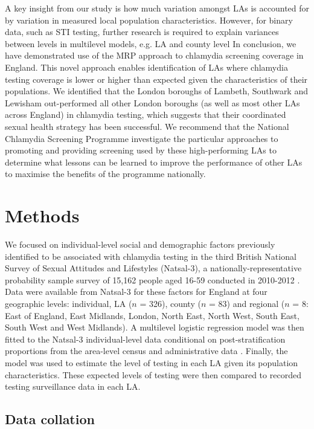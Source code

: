 \documentclass[fleqn,10pt]{wlscirep}
\begin{document}
A key insight from our study is how much variation amongst LAs is accounted for by variation in measured local population characteristics. However, for binary data, such as STI testing, further research is required to explain variances between levels in multilevel models, e.g. LA and county level \cite{Gelman2006}
In conclusion, we have demonstrated use of the MRP approach to chlamydia screening coverage in England. This novel approach enables identification of LAs where chlamydia testing coverage is lower or higher than expected given the characteristics of their populations. We identified that the London boroughs of Lambeth, Southwark and Lewisham out-performed all other London boroughs (as well as most other LAs across England) in chlamydia testing, which suggests that their coordinated sexual health strategy \cite{LSLstrategy2014,MEDFASH2008} has been successful. We recommend that the National Chlamydia Screening Programme investigate the particular approaches to promoting and providing screening used by these high-performing LAs to determine what lessons can be learned to improve the performance of other LAs to maximise the benefits of the programme nationally. 


\section*{Methods}

We focused on individual-level social and demographic factors previously identified to be associated with chlamydia testing in the third British National Survey of Sexual Attitudes and Lifestyles (Natsal-3), a nationally-representative probability sample survey of 15,162 people aged 16-59 conducted in 2010-2012 \cite{Erens2014,Johnson2017}. Data were available from Natsal-3 for these factors for England at four geographic levels: individual, LA ($n$ = 326), county ($n$ = 83) and regional ($n$ = 8: East of England, East Midlands, London, North East, North West, South East, South West and West Midlands). A multilevel logistic regression model was then fitted to the Natsal-3 individual-level data conditional on post-stratification proportions from the area-level census and administrative data \cite{Park2004}. Finally, the model was used to estimate the level of testing in each LA given its population characteristics. These expected levels of testing were then compared to recorded testing surveillance data in each LA.

\subsection*{Data collation}
\end{document}
